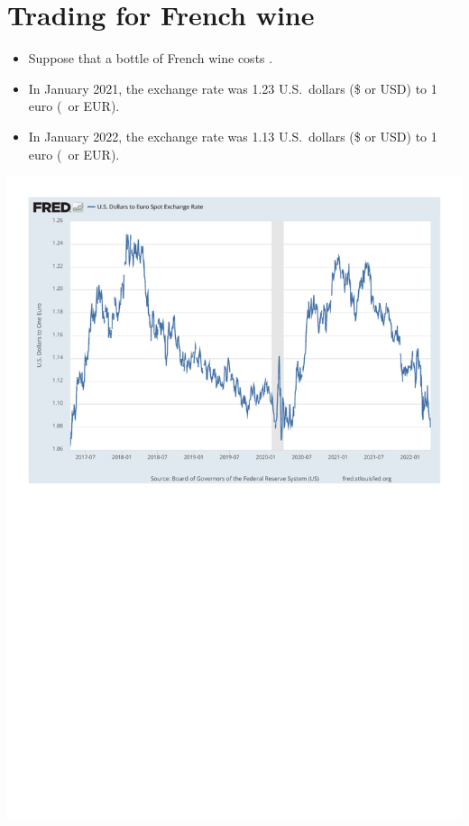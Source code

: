 \documentclass[
    letterpaper,paper=portrait,fleqn,
    DIV=16,fontsize=12pt,twoside=semi,
    parskip=full-,
    headings=standardclasses]
{scrartcl}
\begin{document}
\clearpage

\section{Trading for French wine}

\begin{itemize}
\item Suppose that a bottle of French wine costs .
\item In January 2021, the exchange rate was 1.23 U.S.~dollars (\$ or USD) to 1 euro (\texteuro\, or EUR).
\item In January 2022, the exchange rate was 1.13 U.S.~dollars (\$ or USD) to 1 euro (\texteuro\, or EUR).
\end{itemize}

\vfill

\includegraphics[trim=1cm 15.5cm 1cm 1cm,clip,width=6.5in]{figures/fred_usd_eur.pdf}
\end{document}
